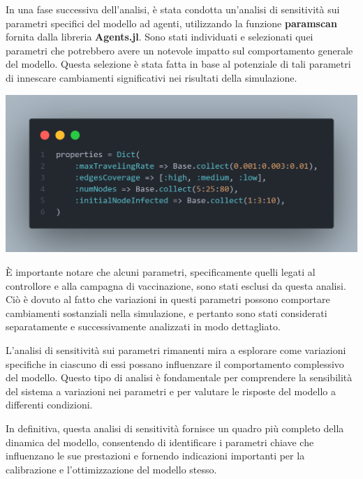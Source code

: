 In una fase successiva dell'analisi, è stata condotta un'analisi di 
sensitività sui parametri specifici del modello ad agenti, 
utilizzando la funzione \textbf{paramscan} fornita dalla libreria 
\textbf{Agents.jl}. Sono stati individuati e selezionati quei 
parametri che potrebbero avere un notevole impatto sul comportamento 
generale del modello. Questa selezione è stata fatta in base al 
potenziale di tali parametri di innescare cambiamenti significativi nei 
risultati della simulazione.

\begin{minipage}{\linewidth}
	\centering
	\includegraphics[width=\textwidth]{img/paramscan.png}
	\label{fig:paramscan}
\end{minipage}

È importante notare che alcuni parametri, specificamente quelli 
legati al controllore e alla campagna di vaccinazione, sono stati 
esclusi da questa analisi. Ciò è dovuto al fatto che variazioni in 
questi parametri possono comportare cambiamenti sostanziali nella 
simulazione, e pertanto sono stati considerati separatamente e 
successivamente analizzati in modo dettagliato.


L'analisi di sensitività sui parametri rimanenti mira a esplorare 
come variazioni specifiche in ciascuno di essi possano influenzare 
il comportamento complessivo del modello. Questo tipo di analisi è 
fondamentale per comprendere la sensibilità del sistema a variazioni 
nei parametri e per valutare le risposte del modello a differenti 
condizioni.

In definitiva, questa analisi di sensitività fornisce un quadro più 
completo della dinamica del modello, consentendo di identificare i 
parametri chiave che influenzano le sue prestazioni e fornendo 
indicazioni importanti per la calibrazione e l'ottimizzazione del 
modello stesso.
\newpage

